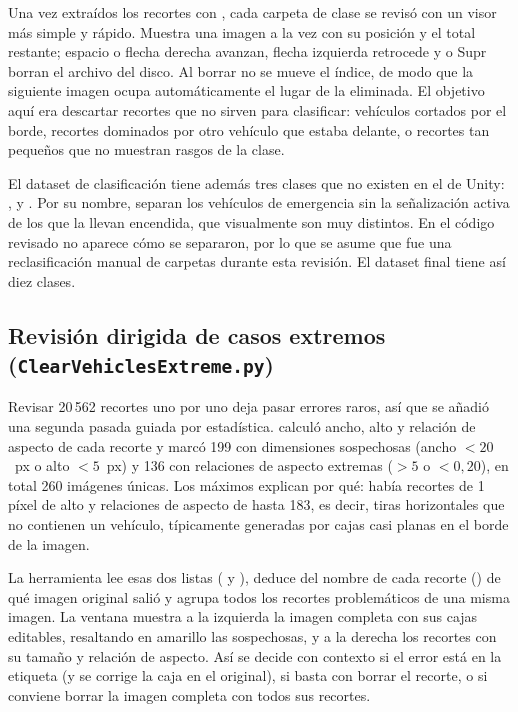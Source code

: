 \documentclass[11pt,a4paper]{article}
\begin{document}
Una vez extraídos los recortes con , cada carpeta de clase se revisó con un visor más simple y rápido. Muestra una imagen a la vez con su posición y el total restante; espacio o flecha derecha avanzan, flecha izquierda retrocede y  o Supr borran el archivo del disco. Al borrar no se mueve el índice, de modo que la siguiente imagen ocupa automáticamente el lugar de la eliminada. El objetivo aquí era descartar recortes que no sirven para clasificar: vehículos cortados por el borde, recortes dominados por otro vehículo que estaba delante, o recortes tan pequeños que no muestran rasgos de la clase.

El dataset de clasificación tiene además tres clases que no existen en el  de Unity: ,  y . Por su nombre, separan los vehículos de emergencia sin la señalización activa de los que la llevan encendida, que visualmente son muy distintos. En el código revisado no aparece cómo se separaron, por lo que se asume que fue una reclasificación manual de carpetas durante esta revisión. El dataset final tiene así diez clases.

\subsection{Revisión dirigida de casos extremos (\texorpdfstring{\texttt{ClearVehiclesExtreme.py}}{ClearVehiclesExtreme.py})}

Revisar 20\,562 recortes uno por uno deja pasar errores raros, así que se añadió una segunda pasada guiada por estadística.  calculó ancho, alto y relación de aspecto de cada recorte y marcó 199 con dimensiones sospechosas (ancho $< 20$~px o alto $< 5$~px) y 136 con relaciones de aspecto extremas ($> 5$ o $< 0{,}20$), en total 260 imágenes únicas. Los máximos explican por qué: había recortes de 1 píxel de alto y relaciones de aspecto de hasta 183, es decir, tiras horizontales que no contienen un vehículo, típicamente generadas por cajas casi planas en el borde de la imagen.

La herramienta lee esas dos listas ( y ), deduce del nombre de cada recorte () de qué imagen original salió y agrupa todos los recortes problemáticos de una misma imagen. La ventana muestra a la izquierda la imagen completa con sus cajas editables, resaltando en amarillo las sospechosas, y a la derecha los recortes con su tamaño y relación de aspecto. Así se decide con contexto si el error está en la etiqueta (y se corrige la caja en el  original), si basta con borrar el recorte, o si conviene borrar la imagen completa con todos sus recortes.
\end{document}
